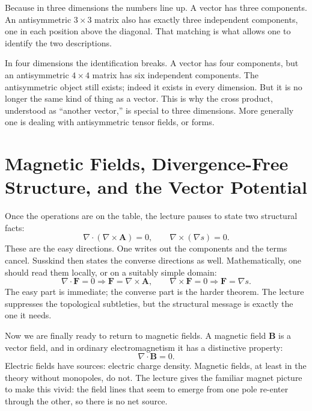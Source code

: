 Because in three dimensions the numbers line up. A vector has three components. An antisymmetric \(3\times 3\) matrix also has exactly three independent components, one in each position above the diagonal. That matching is what allows one to identify the two descriptions.

In four dimensions the identification breaks. A vector has four components, but an antisymmetric \(4\times 4\) matrix has six independent components. The antisymmetric object still exists; indeed it exists in every dimension. But it is no longer the same kind of thing as a vector. This is why the cross product, understood as ``another vector,'' is special to three dimensions. More generally one is dealing with antisymmetric tensor fields, or forms.

\section{Magnetic Fields, Divergence-Free Structure, and the Vector Potential}

Once the operations are on the table, the lecture pauses to state two structural facts:
\begin{equation}
\nabla\cdot(\nabla\times\mathbf A)=0,
\qquad
\nabla\times(\nabla s)=0.
\end{equation}
These are the easy directions. One writes out the components and the terms cancel. Susskind then states the converse directions as well. Mathematically, one should read them locally, or on a suitably simple domain:
\begin{equation}
\nabla\cdot \mathbf F=0 \Longrightarrow \mathbf F=\nabla\times\mathbf A,
\qquad
\nabla\times \mathbf F=0 \Longrightarrow \mathbf F=\nabla s.
\end{equation}
The easy part is immediate; the converse part is the harder theorem. The lecture suppresses the topological subtleties, but the structural message is exactly the one it needs.

Now we are finally ready to return to magnetic fields. A magnetic field \(\mathbf B\) is a vector field, and in ordinary electromagnetism it has a distinctive property:
\begin{equation}
\nabla\cdot \mathbf B=0.
\end{equation}
Electric fields have sources: electric charge density. Magnetic fields, at least in the theory without monopoles, do not. The lecture gives the familiar magnet picture to make this vivid: the field lines that seem to emerge from one pole re-enter through the other, so there is no net source.

